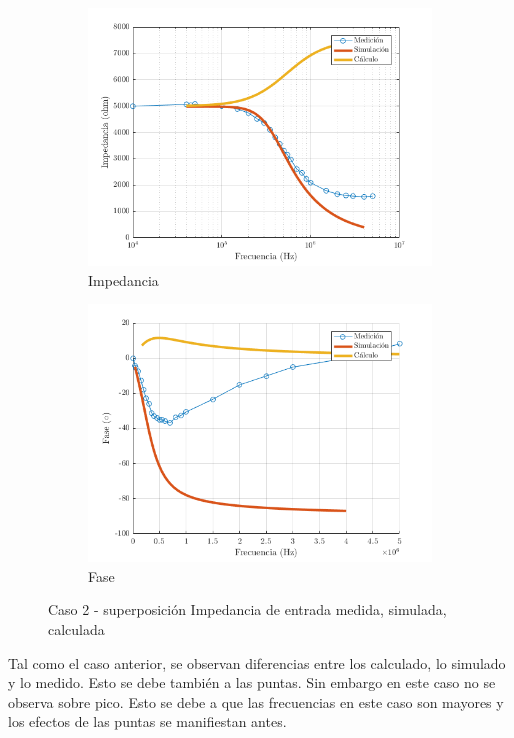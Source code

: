 \documentclass[../../main.tex]{subfiles}
\begin{document}
\begin{figure}[H]
\centering
\begin{subfigure}[http]{0.49\textwidth}
\includegraphics[width=\textwidth]{imagenes/z_inv_r_c2.png}
\caption{Impedancia}\label{fig=zInvZc2}
\end{subfigure}
\begin{subfigure}[http]{0.49\textwidth}
\includegraphics[width=\textwidth]{imagenes/z_inv_f_c2.png}
\caption{Fase} \label{fig=zInvFc2}
\end{subfigure}
\caption{Caso 2 - superposición Impedancia de entrada  medida, simulada, calculada}
\end{figure}

Tal como el caso anterior, se observan diferencias entre los calculado, lo simulado y lo medido. Esto se debe también a las puntas. Sin embargo en este caso no se observa sobre pico. Esto se debe a que las frecuencias en este caso son mayores y los efectos de las puntas se manifiestan antes.
\end{document}
